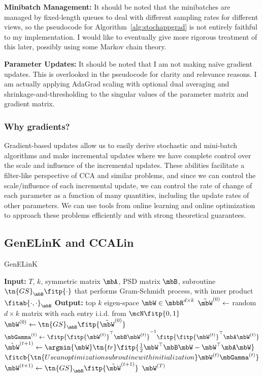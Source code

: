 \documentclass{article}
\begin{document}
	\noindent \textbf{Minibatch Management:} It should be noted that the minibatches are managed by fixed-length queues to deal with different sampling rates for different views, so the pseudocode for Algorithm~\ref{alg:stochappgrad} is not entirely faithful to my implementation. I would like to eventually give more rigorous treatment of this later, possibly using some Markov chain theory.
	
	\noindent \textbf{Parameter Updates:} It should be noted that I am not making na\"{i}ve gradient updates. This is overlooked in the pseudocode for clarity and relevance reasons. I am actually applying AdaGrad scaling with optional dual averaging and shrinkage-and-thresholding to the singular values of the parameter matrix and gradient matrix.
	
	\subsubsection{Why gradients?} \label{subsubsec:whygradients}
	Gradient-based updates allow us to easily derive stochastic and mini-batch algorithms and make incremental updates where we have complete control over the scale and influence of the incremental updates. These abilities facilitate a filter-like perspective of CCA and similar problems, and since we can control the scale/influence of each incremental update, we can control the rate of change of each parameter as a function of many quantities, including the update rates of other parameters. We can use tools from online learning and online optimization to approach these problems efficiently and with strong theoretical guarantees.
	
	\subsection{GenELinK and CCALin} \label{subsec:genelinkandccalin}
	
	\begin{algorithm}
	\caption{GenELinK} \label{alg:genelink}
	\begin{algorithmic}[1]
	\STATE \textbf{Input:} $T$, $k$, symmetric matrix $\mbA$, PSD matrix $\mbB$, subroutine $\tn{GS}_{\mbB}\fitp{\cdot}$ that performs Gram-Schmidt process, with inner product $\fitab{\cdot,\cdot}_{\mbB}$
	\STATE \textbf{Output:} top $k$ eigen-space $\mbW \in \mbbR^{d \times k}$
	\STATE $\tilde{\mbW}^{(0)} \leftarrow$ random $d \times k$ matrix with each entry i.i.d. from $\mcN \fitp{0,1}$
	\STATE $\mbW^{(0)} \leftarrow \tn{GS}_{\mbB}\fitp{\tilde{\mbW}^{(0)}}$
	\STATE $\mbGamma^{(t)} \leftarrow \fitp{\fitp{\mbW^{(t)}}^{\top}\mbB\mbW^{(t)}}^{-1} \fitp{\fitp{\mbW^{(t)}}^{\top}\mbA\mbW^{(t)}}$
	\STATE $\tilde{\mbW}^{(t+1)} \leftarrow \argmin{\mbW} \tn{tr}\fitp{\frac{1}{2}\mbW^{\top}\mbB\mbW - \mbW^{\top}\mbA\mbW}$
	\STATE $\fitcb{\tn{Use an optimization subroutine with initialization } \mbW^{(t)}\mbGamma^{(t)}}$
	\STATE $\mbW^{(t+1)} \leftarrow \tn{GS}_{\mbB}\fitp{\tilde{\mbW}^{(t+1)}}$
	\ENDFOR
	\RETURN $\mbW^{(T)}$
	\end{algorithmic}
	\end{algorithm}
	
\end{document}
